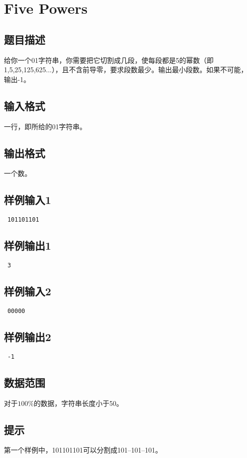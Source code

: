 \section{Five Powers}
\subsection{题目描述}
\par 给你一个01字符串，你需要把它切割成几段，使每段都是5的幂数（即1,5,25,125,625...），且不含前导零，要求段数最少。输出最小段数。如果不可能，输出-1。
\subsection{输入格式}
\par 一行，即所给的01字符串。
\subsection{输出格式}
\par 一个数。
\subsection{样例输入1}\par
{\tt
101101101
}
\subsection{样例输出1}\par
{\tt
3
}
\subsection{样例输入2}\par
{\tt
00000
}
\subsection{样例输出2}\par
{\tt
-1
}
\subsection{数据范围}
\par 对于$100\%$的数据，字符串长度小于50。
\subsection{提示}
\par 第一个样例中，101101101可以分割成101--101--101。

